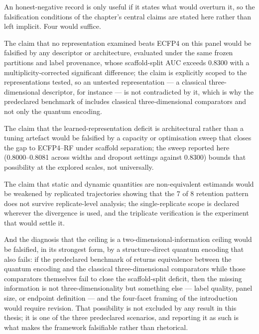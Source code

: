 An honest-negative record is only useful if it states what would overturn it, so the falsification conditions of the chapter's central claims are stated here rather than left implicit. Four would suffice.

The claim that no representation examined beats ECFP4 on this panel would be falsified by any descriptor or architecture, evaluated under the same frozen partitions and label provenance, whose scaffold-split AUC exceeds \num{0.8300} with a multiplicity-corrected significant difference; the claim is explicitly scoped to the representations tested, so an untested representation --- a classical three-dimensional descriptor, for instance --- is not contradicted by it, which is why the predeclared benchmark of  includes classical three-dimensional comparators and not only the quantum encoding.

The claim that the learned-representation deficit is architectural rather than a tuning artefact would be falsified by a capacity or optimisation sweep that closes the gap to ECFP4--RF under scaffold separation; the sweep reported here (\numrange{0.8000}{0.8081} across widths and dropout settings against \num{0.8300}) bounds that possibility at the explored scales, not universally.

The claim that static and dynamic quantities are non-equivalent estimands would be weakened by replicated trajectories showing that the \num{7} of \num{8} retention pattern does not survive replicate-level analysis; the single-replicate scope is declared wherever the divergence is used, and the triplicate verification is the experiment that would settle it.

And the diagnosis that the ceiling is a two-dimensional-information ceiling would be falsified, in its strongest form, by a structure-direct quantum encoding that also fails: if the predeclared benchmark of  returns equivalence between the quantum encoding and the classical three-dimensional comparators while those comparators themselves fail to close the scaffold-split deficit, then the missing information is not three-dimensionality but something else --- label quality, panel size, or endpoint definition --- and the four-facet framing of the introduction would require revision. That possibility is not excluded by any result in this thesis; it is one of the three predeclared scenarios, and reporting it as such is what makes the framework falsifiable rather than rhetorical.
